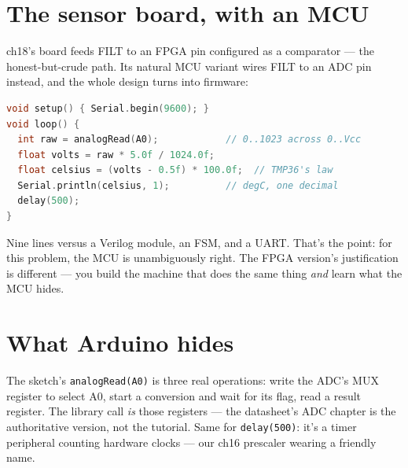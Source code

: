 \section{The sensor board, with an MCU}\label{sec:variant19}

ch18's board feeds FILT to an FPGA pin configured as a comparator
--- the honest-but-crude path. Its natural MCU variant wires FILT
to an ADC pin instead, and the whole design turns into firmware:

\begin{lstlisting}[caption={The sensor board's MCU variant, as an
Arduino sketch (shown, not run here --- the same sketch the docs
publish verbatim).},language=C]
void setup() { Serial.begin(9600); }
void loop() {
  int raw = analogRead(A0);            // 0..1023 across 0..Vcc
  float volts = raw * 5.0f / 1024.0f;
  float celsius = (volts - 0.5f) * 100.0f;  // TMP36's law
  Serial.println(celsius, 1);          // degC, one decimal
  delay(500);
}
\end{lstlisting}

Nine lines versus a Verilog module, an FSM, and a UART. That's the
point: for this problem, the MCU is unambiguously right. The FPGA
version's justification is different --- you build the machine
that does the same thing \emph{and} learn what the MCU hides.

\section{What Arduino hides}\label{sec:hides19}

The sketch's \texttt{analogRead(A0)} is three real operations:
write the ADC's MUX register to select A0, start a conversion and
wait for its flag, read a result register. The library call
\emph{is} those registers --- the datasheet's ADC chapter is the
authoritative version, not the tutorial. Same for
\texttt{delay(500)}: it's a timer peripheral counting hardware
clocks --- our ch16 prescaler wearing a friendly name.

